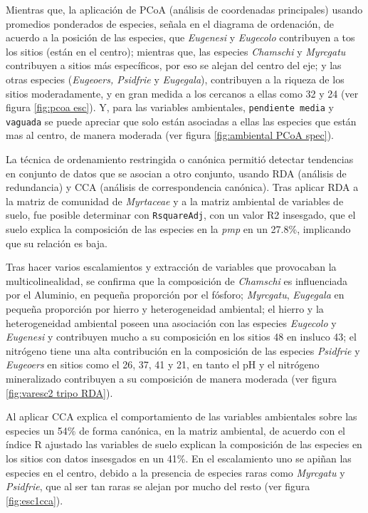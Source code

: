 \documentclass[11pt,]{article}
\begin{document}
Mientras que, la aplicación de PCoA (análisis de coordenadas
principales) usando promedios ponderados de especies, señala en el
diagrama de ordenación, de acuerdo a la posición de las especies, que
\emph{Eugenesi} y \emph{Eugecolo} contribuyen a tos los sitios (están en
el centro); mientras que, las especies \emph{Chamschi} y \emph{Myrcgatu}
contribuyen a sitios más específicos, por eso se alejan del centro del
eje; y las otras especies (\emph{Eugeoers, Psidfrie} y \emph{Eugegala}),
contribuyen a la riqueza de los sitios moderadamente, y en gran medida a
los cercanos a ellas como 32 y 24 (ver figura \ref{fig:pcoa esc}). Y,
para las variables ambientales, \texttt{pendiente\ media} y
\texttt{vaguada} se puede apreciar que solo están asociadas a ellas las
especies que están mas al centro, de manera moderada (ver figura
\ref{fig:ambiental PCoA spec}).

La técnica de ordenamiento restringida o canónica permitió detectar
tendencias en conjunto de datos que se asocian a otro conjunto, usando
RDA (análisis de redundancia) y CCA (análisis de correspondencia
canónica). Tras aplicar RDA a la matriz de comunidad de \emph{Myrtaceae}
y a la matriz ambiental de variables de suelo, fue posible determinar
con \texttt{RsquareAdj}, con un valor R2 insesgado, que el suelo explica
la composición de las especies en la \emph{pmp} en un 27.8\%, implicando
que su relación es baja.

Tras hacer varios escalamientos y extracción de variables que provocaban
la multicolinealidad, se confirma que la composición de \emph{Chamschi}
es influenciada por el Aluminio, en pequeña proporción por el fósforo;
\emph{Myrcgatu}, \emph{Eugegala} en pequeña proporción por hierro y
heterogeneidad ambiental; el hierro y la heterogeneidad ambiental poseen
una asociación con las especies \emph{Eugecolo} y \emph{Eugenesi} y
contribuyen mucho a su composición en los sitios 48 en insluco 43; el
nitrógeno tiene una alta contribución en la composición de las especies
\emph{Psidfrie} y \emph{Eugeoers} en sitios como el 26, 37, 41 y 21, en
tanto el pH y el nitrógeno mineralizado contribuyen a su composición de
manera moderada (ver figura \ref{fig:varesc2 tripo RDA}).

Al aplicar CCA explica el comportamiento de las variables ambientales
sobre las especies un 54\% de forma canónica, en la matriz ambiental, de
acuerdo con el índice R ajustado las variables de suelo explican la
composición de las especies en los sitios con datos insesgados en un
41\%. En el escalamiento uno se apiñan las especies en el centro, debido
a la presencia de especies raras como \emph{Myrcgatu} y \emph{Psidfrie},
que al ser tan raras se alejan por mucho del resto (ver figura
\ref{fig:esc1cca}).
\end{document}
